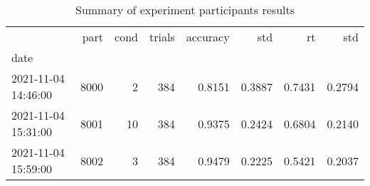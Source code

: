 \begin{table}
\centering
\caption{Summary of experiment participants results}
\label{table-subject-summary}
\begin{tabular}{lrrrrrrr}
\toprule
{} &  part & cond & trials & accuracy &    std &     rt &    std \\
date                &       &      &        &          &        &        &        \\
\midrule
2021-11-04 14:46:00 &  8000 &    2 &    384 &   0.8151 & 0.3887 & 0.7431 & 0.2794 \\
2021-11-04 15:31:00 &  8001 &   10 &    384 &   0.9375 & 0.2424 & 0.6804 & 0.2140 \\
2021-11-04 15:59:00 &  8002 &    3 &    384 &   0.9479 & 0.2225 & 0.5421 & 0.2037 \\
\bottomrule
\end{tabular}
\end{table}
